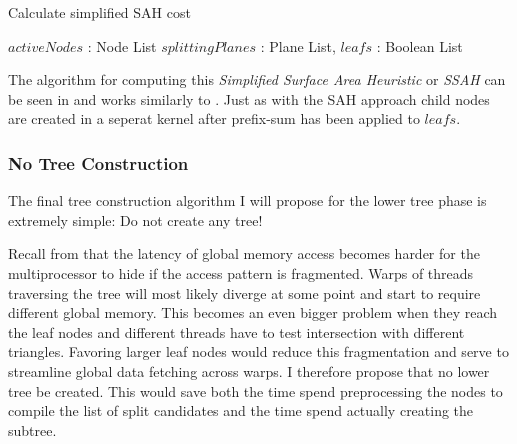 
\begin{algorithm}
  \caption{Calculate simplified SAH cost}
  \label{alg:calcBalancedCost}
  \begin{algorithmic}
              {$activeNodes$ : Node List}
              {$splittingPlanes$ : Plane List, $leafs$ : Boolean List}{
                  \ENDFOR
                \ENDFOR
              }
  \end{algorithmic}
\end{algorithm}


The algorithm for computing this \textit{Simplified Surface Area
  Heuristic} or \textit{SSAH} can be seen in
 and works similarly to
. Just as with the SAH approach child nodes
are created in a seperat kernel after prefix-sum has been applied to
$leafs$.

\subsubsection{No Tree Construction}

The final tree construction algorithm I will propose for the lower
tree phase is extremely simple: Do not create any tree!

Recall from  that the latency of global
memory access becomes harder for the multiprocessor to hide if the
access pattern is fragmented. Warps of threads traversing the tree
will most likely diverge at some point and start to require different
global memory. This becomes an even bigger problem when they reach the
leaf nodes and different threads have to test intersection with
different triangles. Favoring larger leaf nodes would reduce this
fragmentation and serve to streamline global data fetching across
warps. I therefore propose that no lower tree be created. This would
save both the time spend preprocessing the nodes to compile the list
of split candidates and the time spend actually creating the subtree.



